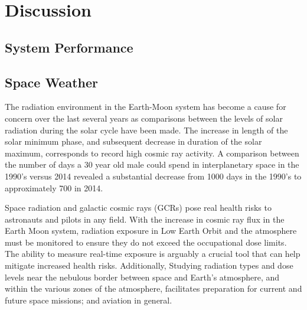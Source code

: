 \section{Discussion}
\label{Discussion}
\subsection{System Performance}
\subsection{Space Weather}

The radiation environment in the Earth-Moon system has become a cause for concern over the last several years as comparisons between the levels of solar radiation during the solar cycle have been made. The increase in length of the solar minimum phase, and subsequent decrease in duration of the solar maximum, corresponds to record high cosmic ray activity.  A comparison between the number of days a 30 year old male could spend in interplanetary space in the 1990's versus 2014 revealed a substantial decrease from 1000 days in the 1990's to approximately 700 in 2014.   



Space radiation and galactic cosmic rays (GCRs) pose real health risks to astronauts and pilots in any field.  With the increase in cosmic ray flux   in the Earth Moon system, radiation exposure in Low Earth Orbit and the atmosphere must be monitored to ensure they do not exceed the occupational dose limits.  The ability to measure real-time exposure is arguably a crucial tool that can help mitigate increased health risks.  Additionally, Studying radiation types and dose levels near the nebulous border between space and Earth's atmosphere, and within the various zones of the atmosphere, facilitates preparation for current and future space missions; and aviation in general.  

